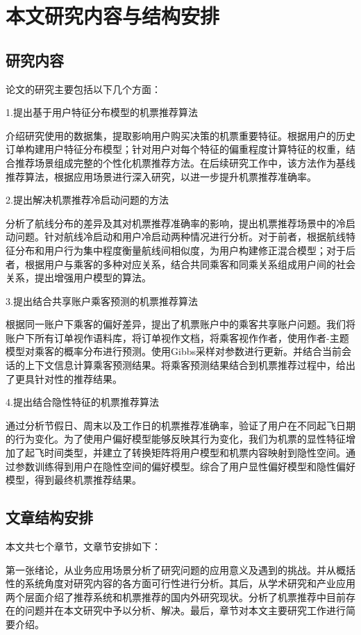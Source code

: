 \section{本文研究内容与结构安排}
\subsection{研究内容}
论文的研究主要包括以下几个方面：

1.提出基于用户特征分布模型的机票推荐算法

介绍研究使用的数据集，提取影响用户购买决策的机票重要特征。根据用户的历史订单构建用户特征分布模型；针对用户对每个特征的偏重程度计算特征的权重，结合推荐场景组成完整的个性化机票推荐方法。在后续研究工作中，该方法作为基线推荐算法，根据应用场景进行深入研究，以进一步提升机票推荐准确率。

2.提出解决机票推荐冷启动问题的方法

分析了航线分布的差异及其对机票推荐准确率的影响，提出机票推荐场景中的冷启动问题。针对航线冷启动和用户冷启动两种情况进行分析。对于前者，根据航线特征分布和用户行为集中程度衡量航线间相似度，为用户构建修正混合模型；对于后者，根据用户与乘客的多种对应关系，结合共同乘客和同乘关系组成用户间的社会关系，提出增强用户模型的算法。


3.提出结合共享账户乘客预测的机票推荐算法

根据同一账户下乘客的偏好差异，提出了机票账户中的乘客共享账户问题。我们将账户下所有订单视作语料库，将订单视作文档，将乘客视作作者，使用作者-主题模型对乘客的概率分布进行预测。使用Gibbs采样对参数进行更新。并结合当前会话的上下文信息计算乘客预测结果。将乘客预测结果结合到机票推荐过程中，给出了更具针对性的推荐结果。

4.提出结合隐性特征的机票推荐算法

通过分析节假日、周末以及工作日的机票推荐准确率，验证了用户在不同起飞日期的行为变化。为了使用户偏好模型能够反映其行为变化，我们为机票的显性特征增加了起飞时间类型，并建立了转换矩阵将用户模型和机票内容映射到隐性空间。通过参数训练得到用户在隐性空间的偏好模型。综合了用户显性偏好模型和隐性偏好模型，得到最终机票推荐结果。


\subsection{文章结构安排}
本文共七个章节，文章节安排如下：

第一张绪论，从业务应用场景分析了研究问题的应用意义及遇到的挑战。并从概括性的系统角度对研究内容的各方面可行性进行分析。其后，从学术研究和产业应用两个层面介绍了推荐系统和机票推荐的国内外研究现状。分析了机票推荐中目前存在的问题并在本文研究中予以分析、解决。最后，章节对本文主要研究工作进行简要介绍。

